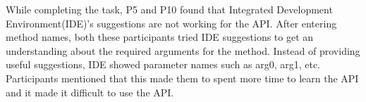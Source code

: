 \documentclass[10pt]{article}
\begin{document}
While completing the task, P5 and P10 found that Integrated Development Environment(IDE)'s suggestions are not working for the API. After entering method names, both these participants tried IDE suggestions to get an understanding about the required arguments for the method. Instead of providing useful suggestions, IDE showed parameter names such as arg0, arg1, etc. Participants mentioned that this made them to spent more time to learn the API and it made it difficult to use the API.




\end{document}
